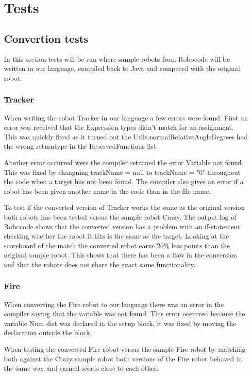 \chapter{Tests}

\section{Convertion tests}
In this section tests will be run where sample robots from Robocode will be written in our language, compiled back to Java and compared with the original robot.

\subsection{Tracker}
When writing the robot Tracker in our language a few errors were found. First an error was received that the Expression types didn't match for an assignment. This was quickly fixed as it turned out the Utils.normalRelativeAngleDegrees had the wrong returntype in the ReservedFunctions list.

Another error occurred were the compiler returned the error Variable not found. This was fixed by changning trackName = null to trackName = "0" throughout the code when a target has not been found. The compiler also gives an error if a robot has been given another name in the code than in the file name.

To test if the converted version of Tracker works the same as the original version both robots has been tested versus the sample robot Crazy. The output log of Robocode shows that the converted version has a problem with an if-statement checking whether the robot it hits is the same as the target. Looking at the scoreboard of the match the converted robot earns 20\% less points than the original sample robot. This shows that there has been a flaw in the conversion and that the robots does not share the exact same functionality.


\subsection{Fire}
When converting the Fire robot to our language there was an error in the compiler saying that the variable was not found. This error occurred because the variable Num dist was declared in the setup block, it was fixed by moving the declaration outside the block.

When testing the converted Fire robot versus the sample Fire robot by matching both against the Crazy sample robot both versions of the Fire robot behaved in the same way and earned scores close to each other.


